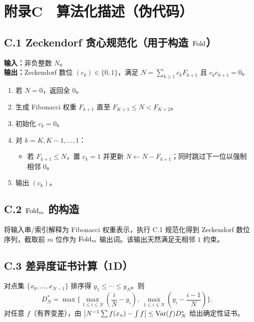 \section{附录C　算法化描述（伪代码）}

\subsection{C.1 Zeckendorf 贪心规范化（用于构造 \texorpdfstring{$\mathrm{Fold}$}{Fold}）}

\textbf{输入：}非负整数 $N$。\\
\textbf{输出：}Zeckendorf 数位 $(c_k)\in\{0,1\}$，满足 $N=\sum_{k\ge1}c_kF_{k+1}$ 且 $c_kc_{k+1}=0$。

\begin{enumerate}
  \item 若 $N=0$，返回全 $0$。
  \item 生成 Fibonacci 权重 $F_{k+1}$ 直至 $F_{K+1}\le N<F_{K+2}$。
  \item 初始化 $c_k=0$。
  \item 对 $k=K,K-1,\dots,1$：
  \begin{itemize}
    \item 若 $F_{k+1}\le N$，置 $c_k=1$ 并更新 $N\leftarrow N-F_{k+1}$；同时跳过下一位以强制相邻 $0$。
  \end{itemize}
  \item 输出 $(c_k)$。
\end{enumerate}

\subsection{C.2 \texorpdfstring{$\mathrm{Fold}_m$}{Fold\_m} 的构造}

将输入串/索引解释为 Fibonacci 权重表示，执行 C.1 规范化得到 Zeckendorf 数位序列，截取前 $m$ 位作为 $\mathrm{Fold}_m$ 输出词。该输出天然满足无相邻 $1$ 约束。

\subsection{C.3 差异度证书计算（1D）}

对点集 $\{x_0,\dots,x_{N-1}\}$ 排序得 $y_1\le\cdots\le y_N$。则
\[
D_N^*=\max\Big\{\max_{1\le i\le N}\left(\frac{i}{N}-y_i\right),\ \max_{1\le i\le N}\left(y_i-\frac{i-1}{N}\right)\Big\}.
\]
对任意 $f$（有界变差），由 $\big|N^{-1}\sum f(x_n)-\int f\big|\le\mathrm{Var}(f)D_N^*$ 给出确定性证书。

